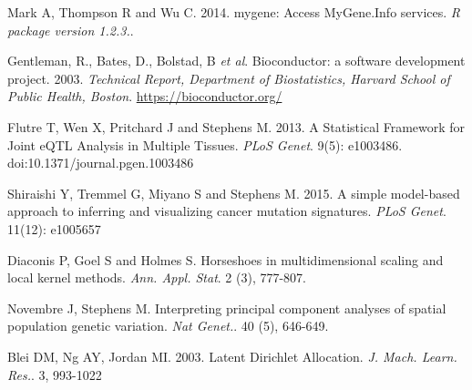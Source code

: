 \documentclass[10pt,letterpaper]{article}
\begin{document}
\begin{thebibliography}{9}

Mark A, Thompson R and Wu C.  2014.
mygene: Access MyGene.Info services.
\textit{R package version 1.2.3.}.

Gentleman, R., Bates, D., Bolstad, B \textit{et al}.
 Bioconductor: a software development project. 2003.
 \textit{Technical Report, Department of Biostatistics, Harvard
School of Public Health, Boston}. \url{https://bioconductor.org/}

%



Flutre T,  Wen X,  Pritchard J and Stephens M. 2013.
A Statistical Framework for Joint eQTL Analysis in Multiple Tissues.
\textit{PLoS Genet}. 9(5): e1003486. doi:10.1371/journal.pgen.1003486

Shiraishi Y, Tremmel G, Miyano S and Stephens M. 2015.
 A simple model-based approach to inferring and visualizing cancer mutation signatures.
\textit{ PLoS Genet}. 11(12): e1005657


Diaconis P, Goel S and Holmes S.
Horseshoes in multidimensional scaling and local kernel methods.
\textit{Ann. Appl. Stat}. 2 (3), 777-807.

Novembre J, Stephens M.
Interpreting principal component analyses of spatial population genetic variation.
\textit{Nat Genet.}. 40 (5),  646-649.

Blei DM,  Ng AY, Jordan MI. 2003.
Latent Dirichlet Allocation.
\textit{J. Mach. Learn. Res.}. 3, 993-1022


\end{thebibliography}
\end{document}
